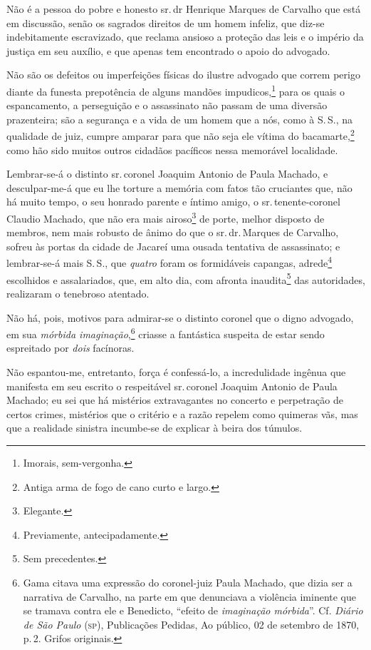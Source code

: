 Não é a pessoa do pobre e honesto sr.\,dr Henrique Marques de Carvalho
que está em discussão, senão os sagrados direitos de um homem infeliz,
que diz-se indebitamente escravizado, que reclama ansioso a proteção das
leis e o império da justiça em seu auxílio, e que apenas tem encontrado
o apoio do advogado.

Não são os defeitos ou imperfeições físicas do ilustre advogado que
correm perigo diante da funesta prepotência de alguns mandões
impudicos,\footnote{ Imorais, sem-vergonha.} para os quais o
espancamento, a perseguição e o assassinato não passam de uma diversão
prazenteira; são a segurança e a vida de um homem que a nós, como à S.\,S., na qualidade de juiz, cumpre amparar para que não seja ele vítima do
bacamarte,\footnote{ Antiga arma de fogo de cano curto e largo.} como
hão sido muitos outros cidadãos pacíficos nessa memorável localidade.

Lembrar-se-á o distinto sr.\,coronel Joaquim Antonio de Paula Machado, e
desculpar-me-á que eu lhe torture a memória com fatos tão cruciantes
que, não há muito tempo, o seu honrado parente e íntimo amigo, o sr.\,tenente-coronel Claudio Machado, que não era mais airoso\footnote{
  Elegante.} de porte, melhor disposto de membros, nem mais robusto de
ânimo do que o sr.\,dr.\,Marques de Carvalho, sofreu às portas da cidade
de Jacareí uma ousada tentativa de assassinato; e lembrar-se-á mais S.\,S., que \emph{quatro} foram os formidáveis capangas, adrede\footnote{
  Previamente, antecipadamente.} escolhidos e assalariados, que, em alto
dia, com afronta inaudita\footnote{ Sem precedentes.} das autoridades,
realizaram o tenebroso atentado.

Não há, pois, motivos para admirar-se o distinto coronel que o digno
advogado, em sua \emph{mórbida imaginação},\footnote{ Gama citava uma
  expressão do coronel-juiz Paula Machado, que dizia ser a narrativa de
  Carvalho, na parte em que denunciava a violência iminente que se
  tramava contra ele e Benedicto, ``efeito de \emph{imaginação mórbida}''.
  Cf. \emph{Diário de São Paulo} (\textsc{sp}), Publicações Pedidas, Ao público,
  02 de setembro de 1870, p.\,2. Grifos originais.} criasse a fantástica suspeita de
estar sendo espreitado por \emph{dois} facínoras.

Não espantou-me, entretanto, força é confessá-lo, a incredulidade
ingênua que manifesta em seu escrito o respeitável sr.\,coronel Joaquim
Antonio de Paula Machado; eu sei que há mistérios extravagantes no
concerto e perpetração de certos crimes, mistérios que o critério e a
razão repelem como quimeras vãs, mas que a realidade sinistra incumbe-se
de explicar à beira dos túmulos.

